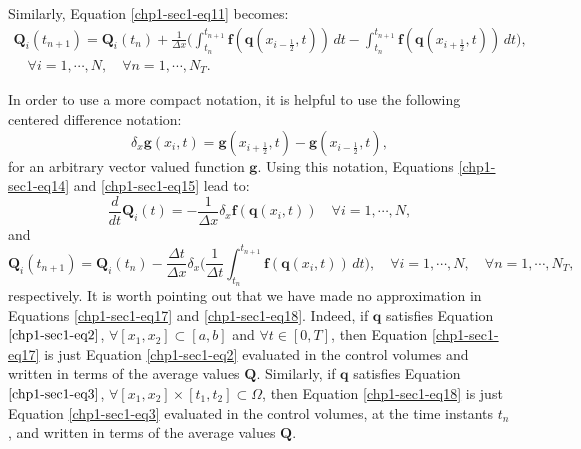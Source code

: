 Similarly, Equation \eqref{chp1-sec1-eq11} becomes:
\begin{equation}
        \label{chp1-sec1-eq15}
	\begin{aligned}
		\mathbf{Q}_i(t_{n+1}) =  \mathbf{Q}_i(t_n) +
		\frac{1}{\Delta x}\bigg( \int_{t_n}^{t_{n+1}}
        	\mathbf{f}(\mathbf{q}(x_{i-\frac{1}{2}}, t)) \,dt -
		\int_{t_n}^{t_{n+1}}\mathbf{f}(\mathbf{q}(x_{i+\frac{1}{2}}, t)) \,dt \bigg),
       		\\
		\quad \forall i = 1, \cdots, N,
		\quad \forall n = 1, \cdots, N_T.
	\end{aligned}
\end{equation}

In order to use a more compact notation, it is helpful to use the following centered difference notation:
\begin{equation}
	\label{chp1-sec1-eq16}
	\delta_x \mathbf{g}(x_i,t) = 
	\mathbf{g}(x_{i+\frac{1}{2}},t) - 
	\mathbf{g}(x_{i-\frac{1}{2}},t),
\end{equation}
for an arbitrary vector valued function $\mathbf{g}$. 
Using this notation, Equations \eqref{chp1-sec1-eq14}
and \eqref{chp1-sec1-eq15} lead to:
\begin{equation}
        \label{chp1-sec1-eq17}
        \frac{d}{dt} \mathbf{Q}_i(t) = -\frac{1}{\Delta x}
	\delta_x \mathbf{f}(\mathbf{q}(x_{i},t))
        \quad \forall i = 1, \cdots, N,
\end{equation}
and
\begin{equation}
        \label{chp1-sec1-eq18}
        \mathbf{Q}_i(t_{n+1}) =  \mathbf{Q}_i(t_n) -
	\frac{\Delta t}{  \Delta x} \delta _x\bigg( \frac{1}{\Delta t}\int_{t_n}^{t_{n+1}}
        \mathbf{f}(\mathbf{q}(x_{i}, t)) \,dt \bigg),
        \quad \forall i = 1, \cdots, N,
        \quad \forall n = 1, \cdots, N_T,
\end{equation}
respectively.
It is worth pointing out that we have made no approximation in Equations
\eqref{chp1-sec1-eq17} and \eqref{chp1-sec1-eq18}. Indeed, if $\mathbf{q}$ satisfies Equation
$\eqref{chp1-sec1-eq2}$, $\forall [x_1, x_2] \subset [a,b]$ and $\forall t \in [0,T]$,
then Equation \eqref{chp1-sec1-eq17} is just Equation
\eqref{chp1-sec1-eq2} evaluated in the control volumes and written
in terms of the average values $\mathbf{Q}$. 
Similarly, if $\mathbf{q}$ satisfies Equation
$\eqref{chp1-sec1-eq3}$, $\forall [x_1, x_2] \times [t_1, t_2] \subset \Omega$,
then Equation \eqref{chp1-sec1-eq18} is just Equation
\eqref{chp1-sec1-eq3} evaluated in the control volumes,
at the time instants $t_n$, and written
in terms of the average values $\mathbf{Q}$.

